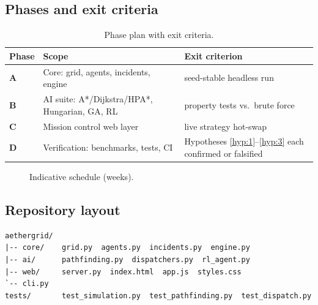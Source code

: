 \documentclass[11pt,a4paper]{article}
\theoremstyle{spaceddef}
\theoremstyle{spacedplain}
\begin{document}
\subsection{Phases and exit criteria}
\begin{table}[H]\centering\small
\begin{tabular}{@{}>{\sffamily\bfseries}llp{6.4cm}@{}}
\toprule
Phase & Scope & Exit criterion \\
\midrule
A & Core: grid, agents, incidents, engine & seed-stable headless run \\
B & AI suite: A*/Dijkstra/HPA*, Hungarian, GA, RL & property tests vs.\ brute force \\
C & Mission control web layer & live strategy hot-swap \\
D & Verification: benchmarks, tests, CI & Hypotheses \ref{hyp:1}--\ref{hyp:3}
      each confirmed or falsified \\
\bottomrule
\end{tabular}
\caption{Phase plan with exit criteria.}
\end{table}

\begin{figure}[H]\centering
{}
\caption{Indicative schedule (weeks).}
\end{figure}

\subsection{Repository layout}
{\small\begin{verbatim}
aethergrid/
|-- core/    grid.py  agents.py  incidents.py  engine.py
|-- ai/      pathfinding.py  dispatchers.py  rl_agent.py
|-- web/     server.py  index.html  app.js  styles.css
`-- cli.py
tests/       test_simulation.py  test_pathfinding.py  test_dispatch.py
\end{verbatim}}
\end{document}
